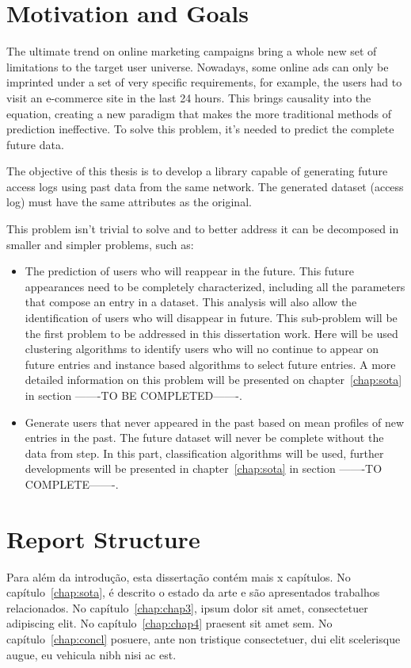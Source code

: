 \section{Motivation and Goals} \label{sec:goals}

The ultimate trend on online marketing campaigns bring a whole new set of limitations to the target user universe. Nowadays, some online ads can only
be imprinted under a set of very specific requirements, for example, the users had to visit an e-commerce site in the last 24 hours. 
This brings causality into the equation, creating a new paradigm that makes 
the more traditional methods of prediction ineffective. To solve this problem, it's needed to predict the complete future data.

The objective of this thesis is to develop a library capable of generating future access logs using past data from the same network.
The generated dataset (access log) must have the same attributes as the original.

This problem isn't trivial to solve and to better address it can be decomposed in smaller and simpler problems, such as:
\begin{itemize}
    \item The prediction of users who will reappear in the future. This future appearances need to be completely characterized, including 
      all the parameters that compose an entry in a dataset. This analysis will also allow the identification of users who will disappear in 
      future. This sub-problem will be the first problem to be addressed in this dissertation work. Here will be used clustering algorithms to 
      identify users who will no continue to appear on future entries and instance based algorithms to select future entries. A more detailed information
      on this problem will be presented on chapter~\ref{chap:sota} in section -------TO BE COMPLETED-------.
    \item Generate users that never appeared in the past based on mean profiles of new entries in the past. The future dataset will never
      be complete without the data from step. In this part, classification algorithms will be used, further developments will be presented in
      chapter~\ref{chap:sota} in section -------TO COMPLETE-------.
\end{itemize}

\section{Report Structure} \label{sec:struct}

Para além da introdução, esta dissertação contém mais x capítulos.
No capítulo~\ref{chap:sota}, é descrito o estado da arte e são
apresentados trabalhos relacionados. 
No capítulo~\ref{chap:chap3}, ipsum dolor sit amet, consectetuer
adipiscing elit.
No capítulo~\ref{chap:chap4} praesent sit amet sem. 
No capítulo~\ref{chap:concl}  posuere, ante non tristique
consectetuer, dui elit scelerisque augue, eu vehicula nibh nisi ac
est. 
